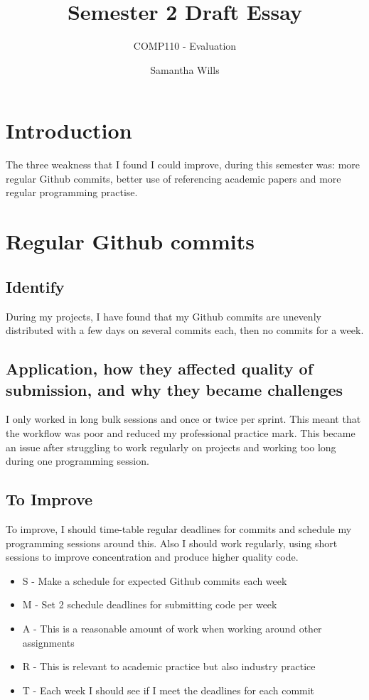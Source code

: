 \documentclass{scrartcl}
\title{Semester 2 Draft Essay}
\subtitle{COMP110 - Evaluation}
\author{Samantha Wills}
\begin{document}
\maketitle

\section*{Introduction}
The three weakness that I found I could improve, during this semester was: more regular Github commits, better use of referencing academic papers and more regular programming practise.

\section*{Regular Github commits}
\subsection*{Identify}
During my projects, I have found that my Github commits are unevenly distributed with a few days on several commits each, then no commits for a week.

\subsection*{Application, how they affected quality of submission, and why they became challenges}
I only worked in long bulk sessions and once or twice per sprint. This meant that the workflow was poor and reduced my professional practice mark. This became an issue after struggling to work regularly on projects and working too long during one programming session.

\subsection*{To Improve}
To improve, I should time-table regular deadlines for commits and schedule my programming sessions around this. Also I should work regularly, using short sessions to improve concentration and produce higher quality code.

 \begin{itemize}
   \item  S - Make a schedule for expected Github commits each week
	\item M - Set 2 schedule deadlines for submitting code per week
	\item A - This is a reasonable amount of work when working around other assignments
	\item R - This is relevant to academic practice but also industry practice
	\item T - Each week I should see if I meet the deadlines for each commit
 \end{itemize}
\end{document}

